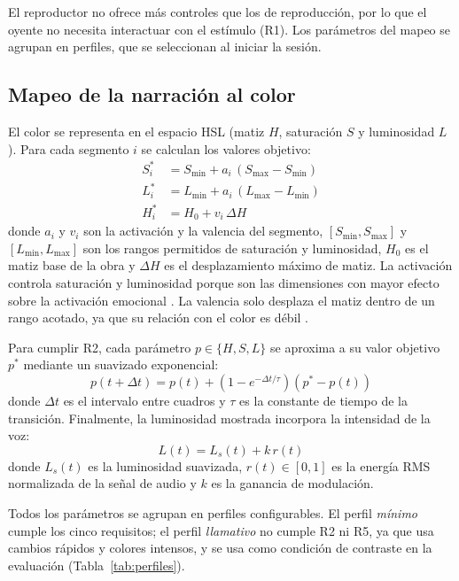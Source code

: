 \documentclass[journal]{IEEEtran}
\begin{document}
El reproductor no ofrece más controles que los de reproducción, por lo que el oyente no necesita interactuar con el estímulo (R1). Los parámetros del mapeo se agrupan en perfiles, que se seleccionan al iniciar la sesión.
 
\subsection{Mapeo de la narración al color}
El color se representa en el espacio HSL (matiz $H$, saturación $S$ y luminosidad $L$). Para cada segmento $i$ se calculan los valores objetivo:
\begin{align}
S_i^{*} &= S_{\min} + a_i\,(S_{\max} - S_{\min}) \label{eq:s}\\
L_i^{*} &= L_{\min} + a_i\,(L_{\max} - L_{\min}) \label{eq:l}\\
H_i^{*} &= H_0 + v_i\,\Delta H \label{eq:h}
\end{align}
donde $a_i$ y $v_i$ son la activación y la valencia del segmento, $[S_{\min}, S_{\max}]$ y $[L_{\min}, L_{\max}]$ son los rangos permitidos de saturación y luminosidad, $H_0$ es el matiz base de la obra y $\Delta H$ es el desplazamiento máximo de matiz. La activación controla saturación y luminosidad porque son las dimensiones con mayor efecto sobre la activación emocional \cite{wilmsoberfeld2018}. La valencia solo desplaza el matiz dentro de un rango acotado, ya que su relación con el color es débil \cite{wilmsoberfeld2018}.
 
Para cumplir R2, cada parámetro $p \in \{H, S, L\}$ se aproxima a su valor objetivo $p^{*}$ mediante un suavizado exponencial:
\begin{equation}
p(t + \Delta t) = p(t) + \left(1 - e^{-\Delta t/\tau}\right)\left(p^{*} - p(t)\right)
\label{eq:suavizado}
\end{equation}
donde $\Delta t$ es el intervalo entre cuadros y $\tau$ es la constante de tiempo de la transición. Finalmente, la luminosidad mostrada incorpora la intensidad de la voz:
\begin{equation}
L(t) = L_{s}(t) + k\, r(t)
\label{eq:intensidad}
\end{equation}
donde $L_{s}(t)$ es la luminosidad suavizada, $r(t) \in [0, 1]$ es la energía RMS normalizada de la señal de audio y $k$ es la ganancia de modulación.
 
Todos los parámetros se agrupan en perfiles configurables. El perfil \textit{mínimo} cumple los cinco requisitos; el perfil \textit{llamativo} no cumple R2 ni R5, ya que usa cambios rápidos y colores intensos, y se usa como condición de contraste en la evaluación (Tabla~\ref{tab:perfiles}).
 
\end{document}
